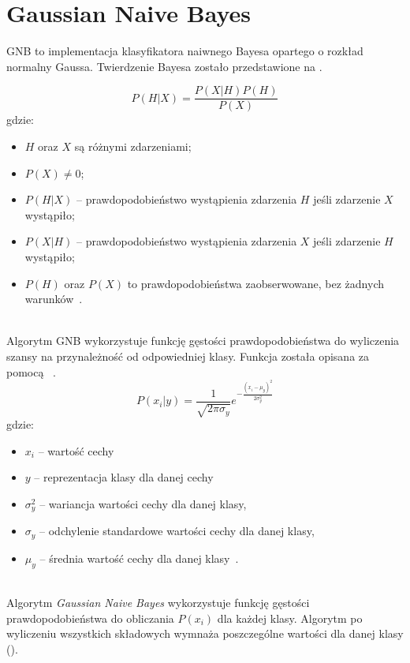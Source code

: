 \section{Gaussian Naive Bayes}
GNB to implementacja klasyfikatora naiwnego Bayesa opartego o rozkład normalny Gaussa.
Twierdzenie Bayesa zostało przedstawione na .
\vfill
\pagebreak

\begin{equation}\label{math:bayes}
P(H|X) = \frac{P(X|H) P(H)}{P(X)}
\end{equation}
gdzie:
\begin{itemize}
    \item $H$ oraz $X$ są różnymi zdarzeniami;
    \item $P(X) \neq 0$;
    \item $P(H|X)$ -- prawdopodobieństwo wystąpienia zdarzenia $H$ jeśli zdarzenie $X$ wystąpiło;
    \item $P(X|H)$ -- prawdopodobieństwo wystąpienia zdarzenia $X$ jeśli zdarzenie $H$ wystąpiło;
    \item $P(H)$ oraz $P(X)$ to prawdopodobieństwa zaobserwowane, bez żadnych warunków~\cite{Leung2007}.
\end{itemize}
\ \\
Algorytm GNB wykorzystuje funkcję gęstości prawdopodobieństwa do wyliczenia szansy na przynależność od odpowiedniej klasy. Funkcja została opisana za pomocą ~\cite{Joyce2003}.
\begin{equation}\label{math:gnb}
    P(x_{i}|y) = \frac{1}{\sqrt{2\pi\sigma_{y}}}e^{-\frac{(x_{i}-\mu_{y})^2}{2\sigma_{y}^{2}}}
\end{equation}
gdzie:
\begin{itemize}
        \item[] \textbf{$x_{i}$} -- wartość cechy
        \item[] \textbf{$y$} -- reprezentacja klasy dla danej cechy
        \item[] \textbf{$\sigma_{y}^{2}$} -- wariancja wartości cechy dla danej klasy,
        \item[] \textbf{$\sigma_{y}$} -- odchylenie standardowe wartości cechy dla danej klasy,
        \item[] \textbf{$\mu_{y}$} -- średnia wartość cechy dla danej klasy~\cite{Leung2007}.
\end{itemize}
\ \\
Algorytm \textit{Gaussian Naive Bayes} wykorzystuje funkcję gęstości prawdopodobieństwa do obliczania $P(x_i)$ dla każdej klasy. Algorytm po wyliczeniu wszystkich składowych wymnaża poszczególne wartości dla danej klasy ().

